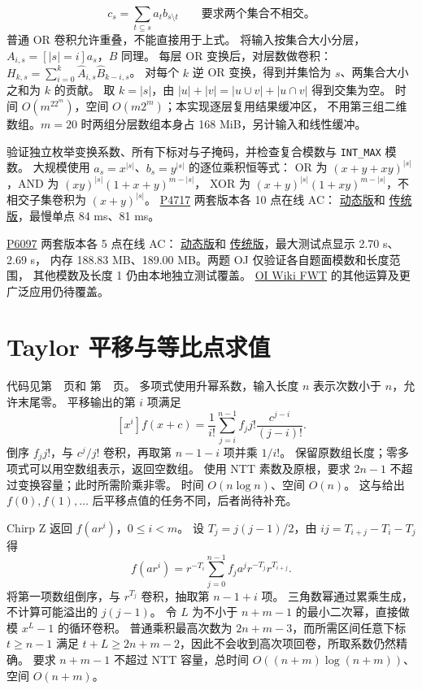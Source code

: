 \[
 c_s=\sum_{t\subseteq s}a_t b_{s\setminus t}
 \qquad\text{要求两个集合不相交。}
\]
普通 OR 卷积允许重叠，不能直接用于上式。
将输入按集合大小分层，$A_{i,s}=[|s|=i]a_s$，$B$ 同理。
每层 OR 变换后，对层数做卷积：
$H_{k,s}=\sum_{i=0}^k\widehat A_{i,s}\widehat B_{k-i,s}$。
对每个 $k$ 逆 OR 变换，得到并集恰为 $s$、两集合大小之和为 $k$ 的贡献。
取 $k=|s|$，由 $|u|+|v|=|u\cup v|+|u\cap v|$ 得到交集为空。
时间 $O(m^22^m)$，空间 $O(m2^m)$；本实现逐层复用结果缓冲区，
不用第三组二维数组。$m=20$ 时两组分层数组本身占 168 MiB，另计输入和线性缓冲。

验证独立枚举变换系数、所有下标对与子掩码，并检查复合模数与
\texttt{INT\_MAX} 模数。
大规模使用 $a_s=x^{|s|}$、$b_s=y^{|s|}$ 的逐位乘积恒等式：
OR 为 $(x+y+xy)^{|s|}$，AND 为 $(xy)^{|s|}(1+x+y)^{m-|s|}$，
XOR 为 $(x+y)^{|s|}(1+xy)^{m-|s|}$，不相交子集卷积为 $(x+y)^{|s|}$。
\href{https://www.luogu.com.cn/problem/P4717}{P4717} 两套版本各 10 点在线 AC：
\href{https://www.luogu.com.cn/record/297630491}{动态版}和
\href{https://www.luogu.com.cn/record/297630911}{传统版}，最慢单点 84 ms、81 ms。

\href{https://www.luogu.com.cn/problem/P6097}{P6097} 两套版本各 5 点在线 AC：
\href{https://www.luogu.com.cn/record/297631186}{动态版}和
\href{https://www.luogu.com.cn/record/297631585}{传统版}，最大测试点显示 2.70 s、2.69 s，
内存 188.83 MB、189.00 MB。两题 OJ 仅验证各自题面模数和长度范围，
其他模数及长度 1 仍由本地独立测试覆盖。
\href{https://oi-wiki.org/math/poly/fwt/}{OI Wiki FWT} 的其他运算及更广泛应用仍待覆盖。

\clearpage
\section{Taylor 平移与等比点求值}\label{knowledge-poly-shift}
代码见第~\pageref{compact-polynomial_shift}~页和
第~\pageref{compact-chirp_z}~页。
多项式使用升幂系数，输入长度 $n$ 表示次数小于 $n$，允许末尾零。
平移输出的第 $i$ 项满足
\[
 [x^i]f(x+c)=\frac1{i!}\sum_{j=i}^{n-1} f_jj!\frac{c^{j-i}}{(j-i)!}.
\]
倒序 $f_jj!$，与 $c^j/j!$ 卷积，再取第 $n-1-i$ 项并乘 $1/i!$。
保留原数组长度；零多项式可以用空数组表示，返回空数组。
使用 NTT 素数及原根，要求 $2n-1$ 不超过变换容量；此时所需阶乘非零。
时间 $O(n\log n)$、空间 $O(n)$。
这与给出 $f(0),f(1),\ldots$ 后平移点值的任务不同，后者尚待补充。

Chirp Z 返回 $f(ar^i)$，$0\le i<m$。
设 $T_j=j(j-1)/2$，由 $ij=T_{i+j}-T_i-T_j$ 得
\[
 f(ar^i)=r^{-T_i}\sum_{j=0}^{n-1}
        f_ja^jr^{-T_j}r^{T_{i+j}}.
\]
将第一项数组倒序，与 $r^{T_j}$ 卷积，抽取第 $n-1+i$ 项。
三角数幂通过累乘生成，不计算可能溢出的 $j(j-1)$。
令 $L$ 为不小于 $n+m-1$ 的最小二次幂，直接做模 $x^L-1$ 的循环卷积。
普通乘积最高次数为 $2n+m-3$，而所需区间任意下标 $t\ge n-1$
满足 $t+L\ge2n+m-2$，因此不会收到高次项回卷，所取系数仍然精确。
要求 $n+m-1$ 不超过 NTT 容量，总时间 $O((n+m)\log(n+m))$、空间 $O(n+m)$。

